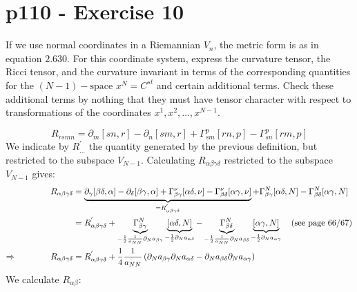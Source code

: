 \section{p110 - Exercise 10}
\begin{tcolorbox}
If we use normal coordinates in a Riemannian $V_n$, the metric form is as in equation $2.630$. For this coordinate system, express the curvature tensor, the Ricci tensor, and the curvature invariant in terms of the corresponding quantities for the $(N-1)-\text{space}$ $x^N = C^{st}$ and certain additional terms. Check these additional terms by nothing that they must have tensor character with respect to transformations of the coordinates $x^1, x^2, \dots, x^{N-1}$.
\end{tcolorbox}
$$R_{rsmn} = \partial_m[sn,r]-\partial_n[sm,r] + \Gamma^p_{sm}[rn,p] -\Gamma^p_{sn}[rm,p]$$
We indicate by $R^{'}_{\dots}$  the quantity generated by the previous definition, but restricted to the subspace $V_{N-1}$. Calculating $R_{\alpha\beta\gamma\delta}$ restricted to the subspace $V_{N-1}$ gives:
\begin{align}
 R_{\alpha\beta\gamma\delta}&= \underbrace{\partial_{\gamma}[\beta \delta, \alpha]-\partial_{\delta}[\beta \gamma, \alpha] + \Gamma^{\nu}_{\beta \gamma}[\alpha \delta, \nu] -\Gamma^{\nu}_{\beta \delta}[\alpha \gamma, \nu]}_{= R^{'}_{\alpha\beta\gamma\delta}}+ \Gamma^{N}_{\beta \gamma}[\alpha \delta,N] -\Gamma^{N}_{\beta \delta}[\alpha \gamma,N]\\
 &= R^{'}_{\alpha\beta\gamma\delta}+ \underbrace{\Gamma^{N}_{\beta \gamma}}_{ -\frac{1}{2}\frac{1}{a_{NN}}\partial_N a_{\beta\gamma}}\underbrace{[\alpha \delta,N]}_{  -\frac{1}{2} \partial_N a_{\alpha\delta}} -\underbrace{\Gamma^{N}_{\beta \delta}}_{-\frac{1}{2}\frac{1}{a_{NN}}\partial_N a_{\beta\delta}  }\underbrace{[\alpha \gamma,N]}_{ -\frac{1}{2} \partial_N a_{\alpha\gamma}}\quad \text{(see page 66/67)}\\
\Rightarrow\quad\quad\quad\quad R_{\alpha\beta\gamma\delta}&= R^{'}_{\alpha\beta\gamma\delta}+ \frac{1}{4}\frac{1}{a_{NN}}\left(\partial_N a_{\beta\gamma} \partial_N a_{\alpha\delta}-\partial_N a_{\beta\delta} \partial_N a_{\alpha\gamma}\right)
\end{align}
We calculate $R_{\alpha\beta}$:
